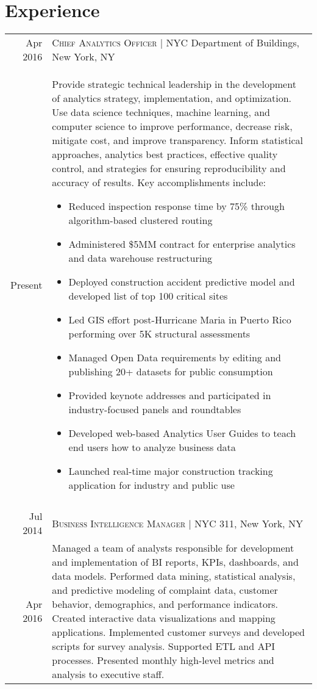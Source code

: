 \documentclass[a4paper,10pt]{article}
\begin{document}
\section{Experience}
\begin{tabular}{r|p{13cm}}
 {Apr 2016} & \textsc{Chief Analytics Officer} | NYC Department of Buildings, New York, NY \\{Present}&\footnotesize{Provide strategic technical leadership in the development of analytics strategy, implementation, and optimization. Use data science techniques, machine learning, and computer science to improve performance, decrease risk, mitigate cost, and improve transparency. Inform statistical approaches, analytics best practices, effective quality control, and strategies for ensuring reproducibility and accuracy of results.  Key accomplishments include:}
 \begin{itemize}
		\item Reduced inspection response time by 75\% through algorithm-based clustered routing
		\item Administered \$5MM  contract for enterprise analytics and data warehouse restructuring
		\item Deployed construction accident predictive model and developed list of top 100 critical sites 
		\item Led GIS effort post-Hurricane Maria in Puerto Rico performing over 5K structural assessments
		\item Managed Open Data requirements by editing and publishing 20+ datasets for public consumption
		\item Provided keynote addresses and participated in industry-focused panels and roundtables
		\item Developed web-based Analytics User Guides to teach end users how to analyze business data
		\item Launched real-time major construction tracking application for industry and public use	
	\end{itemize}\vspace{-1.6em}\\\multicolumn{2}{c}{} \\{Jul 2014} & \textsc{Business Intelligence Manager} | NYC 311, New York, NY \\{Apr 2016}&\footnotesize{Managed a team of analysts responsible for development and implementation of BI reports, KPIs, dashboards, and data models. Performed data mining, statistical analysis, and predictive modeling of complaint data, customer behavior, demographics, and performance indicators. Created interactive data visualizations and mapping applications. Implemented customer surveys and developed scripts for survey analysis. Supported ETL and API processes. Presented monthly high-level metrics and analysis to executive staff.}

\end{tabular}
\end{document}

